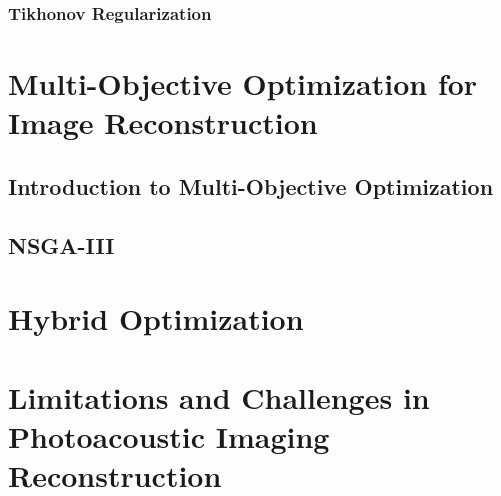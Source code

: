 \subsubsection{Tikhonov Regularization} \label{sec:lit:first:three:two}

\section{Multi-Objective Optimization for Image Reconstruction} \label{sec:lit:second}

\subsection{Introduction to Multi-Objective Optimization} \label{sec:lit:second:one}

\subsection{NSGA-III} \label{sec:lit:second:two}

\section{Hybrid Optimization} \label{sec:lit:second:three}

\section{Limitations and Challenges in Photoacoustic Imaging Reconstruction}

